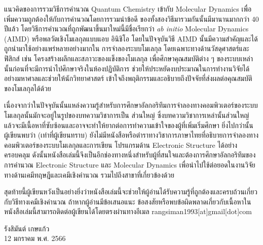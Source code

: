 {แนวคิดของการรวมวิธีการคำนวณ Quantum Chemistry เข้ากับ Molecular Dynamics เพื่อเพิ่มความถูกต้องให้กับการคำนวณโดยการรวมนำข้อดี%
ของทั้งสองวิธีมารวมกันนั้นมีมานานมากกว่า 40 ปีแล้ว โดยวิธีการคำนวณที่ถูกพัฒนาขึ้นมาใหม่นี้มีชื่อเรียกว่า \textit{ab initio} Molecular 
Dynamics (AIMD) หรือพลวัตเชิงโมเลกุลแบบแอบ อินิชิโอ โดยในปัจจุบันวิธี AIMD นั้นมีความสำคัญและได้ถูกนำมาใช้อย่างแพร่หลายอย่างมากใน%
การจำลองระบบโมเลกุล โดยเฉพาะทางด้านวัสดุศาสตร์และฟิสิกส์ เช่น โครงสร้างผลึกและสภาวะของแข็งของโมเลกุล เพื่อศึกษาคุณสมบัติต่าง ๆ 
ของระบบเหล่านั้นก่อนที่จะมีการนำไปศึกษาจริงในห้องปฏิบัติการ ช่วยให้ประหยัดงบประมาณในการทำงานวิจัยได้อย่างมหาศาลและช่วยให้นักวิทยาศาสตร์%
เข้าใจถึงพฤติกรรมและอธิบายถึงปัจจัยที่ส่งผลต่อคุณสมบัติของโมเลกุลได้ด้วย 

เนื่องจากว่าในปัจจุบันนั้นแหล่งความรู้สำหรับการศึกษาอัลกอริทึมการจำลองทางคอมพิวเตอร์ของระบบโมเลกุลนั้นมักจะอยู่ในรูปของบทความวิชาการเป็น%
ส่วนใหญ่ ซึ่งบทความวิชาการเหล่านั้นส่วนใหญ่แล้วจะมีเนื้อหาที่ซับซ้อนและอาจจะทำให้ยากต่อการทำความเข้าใจของผู้ที่เพิ่มเริ่มศึกษา ยิ่งไปกว่านั้น%
ผู้เขียนพบว่า (เท่าที่ผู้เขียนทราบ) ยังไม่มีหนังสือหรือตำราทางวิชาการภาษาไทยที่อธิบายการจำลองทางคอมพิวเตอร์ของระบบโมเลกุลและการเขียน%
โปรแกรมด้าน Electronic Structure ได้อย่างครอบคลุม ดังนั้นหนังสือเล่มนี้จึงเป็นอีกช่องทางหนึ่งสำหรับผู้ที่สนใจและต้องการศึกษาอัลกอริทึมของ%
การคำนวณ Electronic Structure และ Molecular Dynamics เพื่อนำไปใช้ต่อยอดในงานวิจัยทางด้านเคมีทฤษฎีและเคมีเชิงคำนวณ 
รวมไปถึงสาขาที่เกี่ยวข้องด้วย

สุดท้ายนี้ผู้เขียนหวังเป็นอย่างยิ่งว่าหนังสือเล่มนี้จะช่วยให้ผู้อ่านได้รับความรู้ที่ถูกต้องและครบถ้วนเกี่ยวกับวิธีทางเคมีเชิงคำนวณ ถ้าหากผู้อ่านมีข้อเสนอแนะ 
ข้อสงสัยหรือพบข้อผิดพลาดเกี่ยวกับเนื้อหาในหนังสือเล่มนี้สามารถติดต่อผู้เขียนได้โดยตรงผ่านทางอีเมล rangsiman1993[at]gmail[dot]com

\medskip

\begin{flushright}
รังสิมันต์ เกษแก้ว \\
12 มกราคม พ.ศ. 2566
\end{flushright}
}
